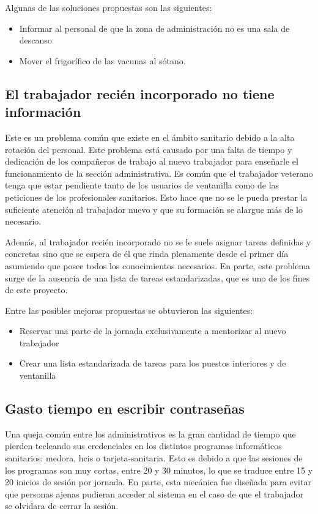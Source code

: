 Algunas de las soluciones propuestas son las siguientes:

\begin{itemize}
    \item Informar al personal de que la zona de administración no es una sala de descanso
    \item Mover el frigorífico de las vacunas al sótano.
\end{itemize}

\subsection{El trabajador recién incorporado no tiene información}

Este es un problema común que existe en el ámbito sanitario debido a la alta rotación del personal.
Este problema está causado por una falta de tiempo y dedicación de los compañeros de trabajo al nuevo trabajador para enseñarle el funcionamiento de la sección administrativa. Es común que el trabajador veterano tenga que estar pendiente tanto de los usuarios de ventanilla como de las peticiones de los profesionales sanitarios. Esto hace que no se le pueda prestar la suficiente atención al trabajador nuevo y que su formación se alargue más de lo necesario.

Además, al trabajador recién incorporado no se le suele asignar tareas definidas y concretas sino que se espera de él que rinda plenamente desde el primer día asumiendo que posee todos los conocimientos necesarios. En parte, este problema surge de la ausencia de una lista de tareas estandarizadas, que es uno de los fines de este proyecto.

Entre las posibles mejoras propuestas se obtuvieron las siguientes:

\begin{itemize}
    \item Reservar una parte de la jornada exclusivamente a mentorizar al nuevo trabajador
    \item Crear una lista estandarizada de tareas para los puestos interiores y de ventanilla
\end{itemize}

\subsection{Gasto tiempo en escribir contraseñas}

Una queja común entre los administrativos es la gran cantidad de tiempo que pierden tecleando sus credenciales en los distintos programas informáticos sanitarios: \Gls{medora}, \Gls{hcis} o \Gls{tarjeta-sanitaria}.
Esto es debido a que las sesiones de los programas son muy cortas, entre 20 y 30 minutos, lo que se traduce entre 15 y 20 inicios de sesión por jornada.
En parte, esta mecánica fue diseñada para evitar que personas ajenas pudieran acceder al sistema en el caso de que el trabajador se olvidara de cerrar la sesión.

